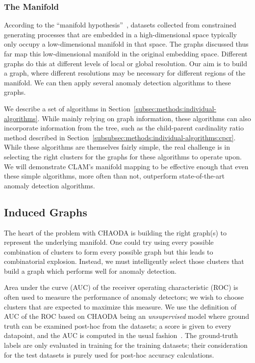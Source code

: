 \subsubsection{The Manifold}
According to the ``manifold hypothesis''~\cite{fefferman2016testing}, datasets collected from constrained generating processes that are embedded in a high-dimensional space typically only occupy a low-dimensional manifold in that space.
The graphs discussed thus far map this low-dimensional manifold in the original embedding space.
Different graphs do this at different levels of local or global resolution.
Our aim is to build a graph, where different resolutions may be necessary for different regions of the manifold.
We can then apply several anomaly detection algorithms to these graphs.

We describe a set of algorithms in Section~\ref{subsec:methods:individual-algorithms}.
While mainly relying on graph information, these algorithms can also incorporate information from the tree, such as the child-parent cardinality ratio method described in Section~\ref{subsubsec:methods:individual-algorithms:cpcr}.
While these algorithms are themselves fairly simple, the real challenge is in selecting the right clusters for the graphs for these algorithms to operate upon.
We will demonstrate CLAM's manifold mapping to be effective enough that even these simple algorithms, more often than not, outperform state-of-the-art anomaly detection algorithms.


\subsection{Induced Graphs}
\label{subsec:methods:induced-graphs}

The heart of the problem with CHAODA is building the right graph(s) to represent the underlying manifold.
One could try using every possible combination of clusters to form every possible graph but this leads to combinatorial explosion.
Instead, we must intelligently select those clusters that build a graph which performs well for anomaly detection.

Area under the curve (AUC) of the receiver operating characteristic (ROC) is often used to measure the performance of anomaly detectors;
we wish to choose clusters that are expected to maximize this measure.
We use the definition of AUC of the ROC based on CHAODA being an \emph{unsupervised} model where ground truth can be examined post-hoc from the datasets; a score is given to every datapoint, and the AUC is computed in the usual fashion~\cite{fawcett2006introduction}.
The ground-truth labels are only evaluated in training for the training datasets; their consideration for the test datasets is purely used for post-hoc accuracy calculations.

